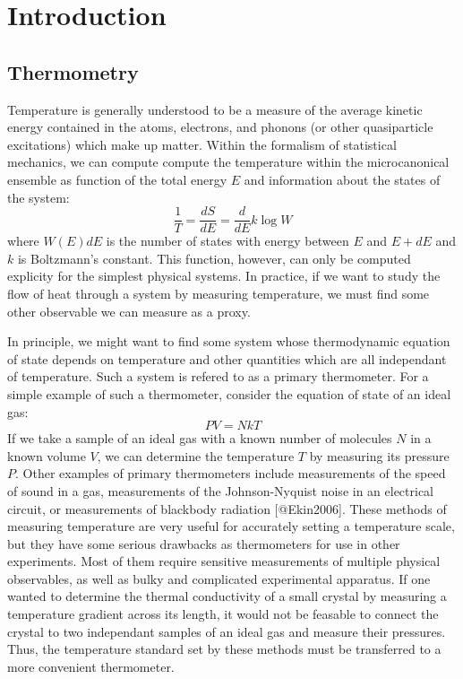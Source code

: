 \documentclass[12pt,]{article}
\date{}
\begin{document}
\hypertarget{introduction}{%
\section{Introduction}\label{introduction}}

\hypertarget{thermometry}{%
\subsection{Thermometry}\label{thermometry}}

Temperature is generally understood to be a measure of the average
kinetic energy contained in the atoms, electrons, and phonons (or other
quasiparticle excitations) which make up matter. Within the formalism of
statistical mechanics, we can compute compute the temperature within the
microcanonical ensemble as function of the total energy \(E\) and
information about the states of the system:
\[\frac{1}{T} = \frac{dS}{dE} = \frac{d}{dE} k \log W\] where \(W(E)dE\)
is the number of states with energy between \(E\) and \(E+dE\) and \(k\)
is Boltzmann's constant. This function, however, can only be computed
explicity for the simplest physical systems. In practice, if we want to
study the flow of heat through a system by measuring temperature, we
must find some other observable we can measure as a proxy.

In principle, we might want to find some system whose thermodynamic
equation of state depends on temperature and other quantities which are
all independant of temperature. Such a system is refered to as a primary
thermometer. For a simple example of such a thermometer, consider the
equation of state of an ideal gas: \[PV = NkT\] If we take a sample of
an ideal gas with a known number of molecules \(N\) in a known volume
\(V\), we can determine the temperature \(T\) by measuring its pressure
\(P\). Other examples of primary thermometers include measurements of
the speed of sound in a gas, measurements of the Johnson-Nyquist noise
in an electrical circuit, or measurements of blackbody radiation
{[}@Ekin2006{]}. These methods of measuring temperature are very useful
for accurately setting a temperature scale, but they have some serious
drawbacks as thermometers for use in other experiments. Most of them
require sensitive measurements of multiple physical observables, as well
as bulky and complicated experimental apparatus. If one wanted to
determine the thermal conductivity of a small crystal by measuring a
temperature gradient across its length, it would not be feasable to
connect the crystal to two independant samples of an ideal gas and
measure their pressures. Thus, the temperature standard set by these
methods must be transferred to a more convenient thermometer.
\end{document}
